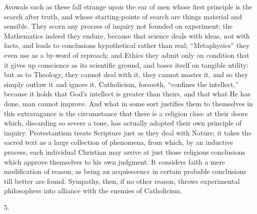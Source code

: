 Avowals such as these fall strange upon the ear of men whose first
principle is the search after truth, and whose starting-points of
search are things material and sensible. They scorn any process of
inquiry not founded on experiment; the Mathematics indeed they endure,
because that science deals with ideas, not with facts, and leads to
conclusions hypothetical rather than real; ``Metaphysics''
they even use as a by-word of reproach; and Ethics they admit only on
condition that it gives up conscience as its scientific ground, and
bases itself on tangible utility: but as to Theology, they cannot deal
with it, they cannot master it, and so they simply outlaw it and
ignore it. Catholicism, forsooth, ``confines the intellect,''
because it holds that God's intellect is greater than theirs, and that
what He has done, man cannot improve. And what in some sort justifies
them to themselves in this extravagance is the circumstance that there
is a religion close at their doors which, discarding so severe a tone,
has actually adopted their own principle of inquiry. Protestantism
treats Scripture just as they deal with Nature; it takes the sacred
text as a large collection of phenomena, from which, by an inductive
process, each individual Christian may arrive at just those religious
conclusions which approve themselves to his own judgment. It
considers faith a mere modification of reason, as being an
acquiescence in certain probable conclusions till better are found.
Sympathy, then, if no other reason, throws experimental philosophers
into alliance with the enemies of Catholicism.

5.

